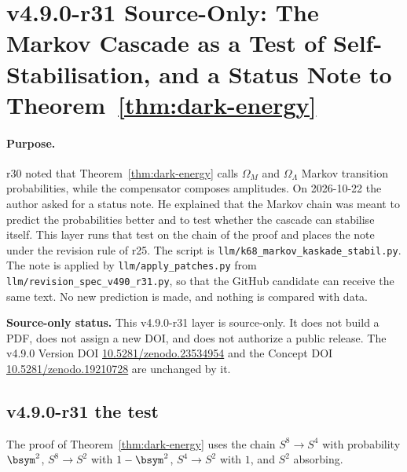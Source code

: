 \clearpage
\section*{v4.9.0-r31 Source-Only: The Markov Cascade as a Test of Self-Stabilisation, and a Status Note to Theorem~\texorpdfstring{\ref{thm:dark-energy}}{dark-energy}}
\label{sec:v490-r31-markov-self-stabilisation}

\paragraph{Purpose.}
r30 noted that Theorem~\ref{thm:dark-energy} calls \(\Omega_M\) and \(\Omega_\Lambda\) Markov transition probabilities, while the compensator
composes amplitudes.  On 2026-10-22 the author asked for a status note.  He explained that the Markov chain was meant to predict the
probabilities better and to test whether the cascade can stabilise itself.  This layer runs that test on the chain of the proof and
places the note under the revision rule of r25.  The script is \texttt{llm/k68\_markov\_kaskade\_stabil.py}.  The note is applied by
\texttt{llm/apply\_patches.py} from \texttt{llm/revision\_spec\_v490\_r31.py}, so that the GitHub candidate can receive the same text.
No new prediction is made, and nothing is compared with data.

\noindent\textbf{Source-only status.}
This v4.9.0-r31 layer is source-only.  It does not build a PDF, does not assign a new DOI,
and does not authorize a public release.  The v4.9.0 Version DOI
\href{https://doi.org/10.5281/zenodo.23534954}{10.5281/zenodo.23534954} and the Concept DOI
\href{https://doi.org/10.5281/zenodo.19210728}{10.5281/zenodo.19210728} are unchanged by it.

\subsection*{v4.9.0-r31 the test}
\label{subsec:v490-r31-test}

The proof of Theorem~\ref{thm:dark-energy} uses the chain \(S^8\to S^4\) with probability \(\bsym^2\), \(S^8\to S^2\) with \(1-\bsym^2\),
\(S^4\to S^2\) with \(1\), and \(S^2\) absorbing.

